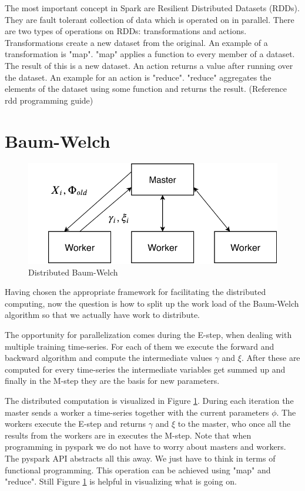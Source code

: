The most important concept in Spark are Resilient Distributed Datasets (RDDs). They are fault tolerant collection of data which is operated on in parallel. There are two types of operations on RDDs: transformations and actions. Transformations create a new dataset from the original. An example of a transformation is "map". "map" applies a function to every member of a dataset. The result of this is a new dataset. An action returns a value after running over the dataset. An example for an action is "reduce". "reduce" aggregates the elements of the dataset using some function and returns the result. (Reference rdd programming guide)

\section{Baum-Welch}
\label{section:distributed-hmm}

\begin{figure}
  \centering
  \includegraphics{figures/distributed.pdf}
  \caption{Distributed Baum-Welch}
  \label{fig:distributed}
\end{figure}

Having chosen the appropriate framework for facilitating the distributed computing, now the question is how to split up the work load of the Baum-Welch algorithm so that we actually have work to distribute. 

The opportunity for parallelization comes during the E-step, when dealing with multiple training time-series. For each of them we execute the forward and backward algorithm and compute the intermediate values $\gamma$ and $\xi$. After these are computed for every time-series the intermediate variables get summed up and finally in the M-step they are the basis for new parameters. 

The distributed computation is visualized in Figure \ref{fig:distributed}. During each iteration the master sends a worker a time-series together with the current parameters $\phi$. The workers execute the E-step and returns $\gamma$ and $\xi$ to the master, who once all the results from the workers are in executes the M-step. Note that when programming in pyspark we do not have to worry about masters and workers. The pyspark API abstracts all this away. We just have to think in terms of functional programming. This operation can be achieved using "map" and "reduce". Still Figure \ref{fig:distributed} is helpful in visualizing what is going on. 

